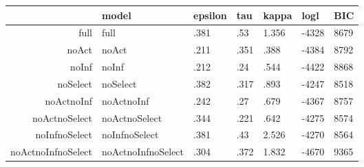 \begin{table}[ht]
\centering
\begin{tabular}{rllllll}
  \hline
 & model & epsilon & tau & kappa & logl & BIC \\ 
  \hline
full & full & .381 & .53 & 1.356 & -4328 & 8679 \\ 
  noAct & noAct & .211 & .351 & .388 & -4384 & 8792 \\ 
  noInf & noInf & .212 & .24 & .544 & -4422 & 8868 \\ 
  noSelect & noSelect & .382 & .317 & .893 & -4247 & 8518 \\ 
  noActnoInf & noActnoInf & .242 & .27 & .679 & -4367 & 8757 \\ 
  noActnoSelect & noActnoSelect & .344 & .221 & .642 & -4275 & 8574 \\ 
  noInfnoSelect & noInfnoSelect & .381 & .43 & 2.526 & -4270 & 8564 \\ 
  noActnoInfnoSelect & noActnoInfnoSelect & .304 & .372 & 1.832 & -4670 & 9365 \\ 
   \hline
\end{tabular}
\end{table}

